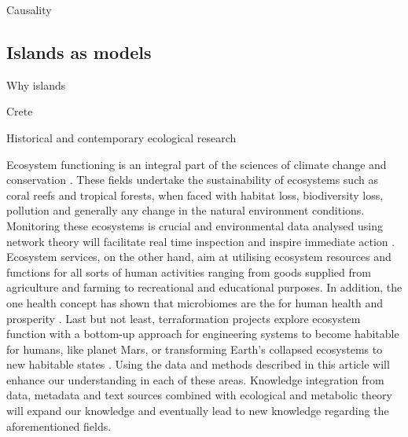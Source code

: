 Causality

\subsection{Islands as models}
\label{sec:island-model}

Why islands

Crete 

Historical and contemporary ecological research

Ecosystem functioning is an integral part of the sciences of climate change
and conservation \citep{cavicchioli2019scientists}. These fields undertake the
sustainability of ecosystems such as coral reefs and tropical forests, when
faced with habitat loss, biodiversity loss, pollution and generally any change
in the natural environment conditions. Monitoring these ecosystems is crucial
and environmental data analysed using network theory will facilitate real time
inspection and inspire immediate action \citep{derocles2018Biomonitoring}.
Ecosystem services, on the other hand, aim at utilising ecosystem resources
and functions for all sorts of human activities ranging from goods supplied
from agriculture and farming \citep{alvarez-silva2017Compartmentalized} to
recreational and educational purposes. In addition, the one health concept has
shown that microbiomes are the for human health and prosperity
\citep{banerjee2023Soil}. Last but not least, terraformation
projects explore ecosystem function with a bottom-up approach for engineering
systems to become habitable for humans, like planet Mars, or transforming
Earth's collapsed ecosystems to new habitable states
\citep{conde-pueyo2020Synthetic}. Using the data and methods described in this
article will enhance our understanding in each of these areas. Knowledge
integration from data, metadata and text sources combined with ecological and
metabolic theory will expand our knowledge and eventually lead to new
knowledge regarding the aforementioned fields.



